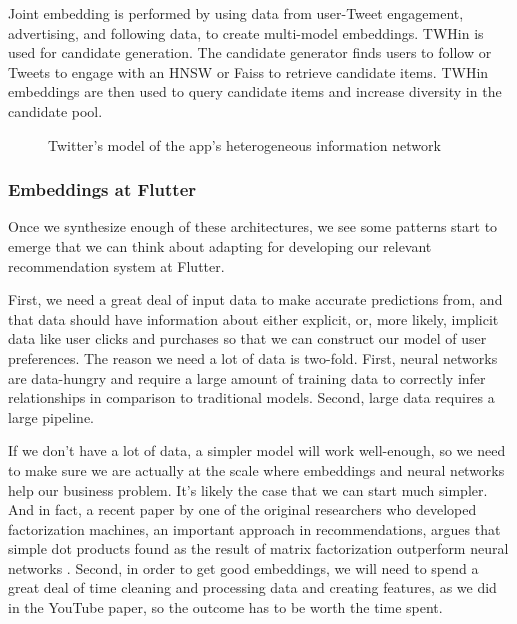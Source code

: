 \documentclass[11pt, table]{diazessay} %
\begin{document}
\begin{sloppypar}
Joint embedding is performed by using data from user-Tweet engagement, advertising, and following data, to create multi-model embeddings. TWHin is used for candidate generation. The candidate generator finds users to follow or Tweets to engage with an HNSW or Faiss to retrieve candidate items. TWHin embeddings are then used to query candidate items and increase diversity in the candidate pool.

\begin{figure}[H]
\caption{Twitter's model of the app's heterogeneous information network \citep{el2022twhin}}
\end{figure}


\subsubsection*{Embeddings at Flutter}

Once we synthesize enough of these architectures, we see some patterns start to emerge that we can think about adapting for developing our relevant recommendation system at Flutter.

First, we need a great deal of input data to make accurate predictions from, and that data should have information about either explicit, or, more likely, implicit data like user clicks and purchases so that we can construct our model of user preferences. The reason we need a lot of data is two-fold. First, neural networks are data-hungry and require a large amount of training data to correctly infer relationships in comparison to traditional models. Second, large data requires a large pipeline.  

If we don't have a lot of data, a simpler model will work well-enough, so we need to make sure we are actually at the scale where embeddings and neural networks help our business problem. It's likely the case that we can start much simpler. And in fact, a recent paper by one of the original researchers who developed factorization machines, an important approach in recommendations, argues that simple dot products found as the result of matrix factorization outperform neural networks \citep{rendle2020neural}.  Second, in order to get good embeddings, we will need to spend a great deal of time cleaning and processing data and creating features, as we did in the YouTube paper, so the outcome has to be worth the time spent.


\end{sloppypar}
\end{document}
